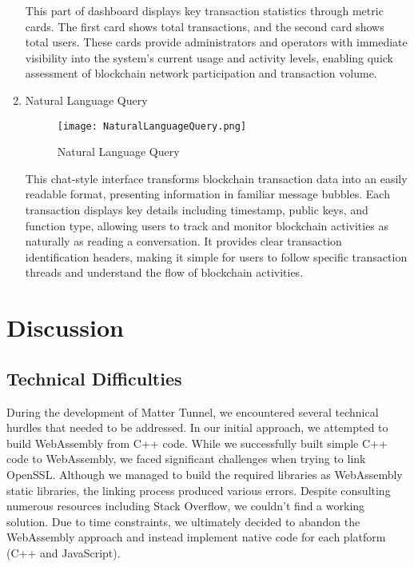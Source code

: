 \documentclass[conference]{IEEEtran}
\begin{document}
\begin{enumerate}[itemsep=2ex, parsep=1ex]
	      This part of dashboard displays key transaction statistics through metric cards. The first card shows total transactions, and the second card shows total users. These cards provide administrators and operators with immediate visibility into the system's current usage and activity levels, enabling quick assessment of blockchain network participation and transaction volume.

        \clearpage

        \item Natural Language Query
	      	      	      
	      \begin{figure}[h!]
	          \centering
	          \texttt{[image: NaturalLanguageQuery.png]}
	          \caption{Natural Language Query}
	          \label{fig:enter-label}
	      \end{figure}
	      	      	      
	      This chat-style interface transforms blockchain transaction data into an easily readable format, presenting information in familiar message bubbles. Each transaction displays key details including timestamp, public keys, and function type, allowing users to track and monitor blockchain activities as naturally as reading a conversation. It provides clear transaction identification headers, making it simple for users to follow specific transaction threads and understand the flow of blockchain activities.
          
\end{enumerate}

\section{Discussion}
    
\subsection{Technical Difficulties}

During the development of Matter Tunnel, we encountered several technical hurdles that needed to be addressed. In our initial approach, we attempted to build WebAssembly from C++ code. While we successfully built simple C++ code to WebAssembly, we faced significant challenges when trying to link OpenSSL. Although we managed to build the required libraries as WebAssembly static libraries, the linking process produced various errors. Despite consulting numerous resources including Stack Overflow, we couldn't find a working solution. Due to time constraints, we ultimately decided to abandon the WebAssembly approach and instead implement native code for each platform (C++ and JavaScript).
\end{document}
